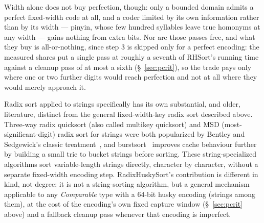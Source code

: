 \documentclass[twoside,leqno,twocolumn]{article}
\begin{document}
Width alone does not buy perfection, though:
only a bounded domain admits a perfect fixed-width code at all,
and a coder limited by its own information rather than by its width --- pinyin, whose few hundred
syllables leave true homonyms at any width --- gains nothing from extra bits.
Nor are those passes free, and what they buy is all-or-nothing, since step 3 is skipped only for a
perfect encoding: the measured shares put a single pass at roughly a seventh of RHSort's running time
against a cleanup pass of at most a sixth (\S~\ref{sec:pcrit}), so the trade pays only where one or
two further digits would reach perfection and not at all where they would merely approach it.

Radix sort applied to strings specifically has its own substantial, and older, literature,
distinct from the general fixed-width-key radix sort described above.
Three-way radix quicksort (also called multikey quicksort) and MSD (most-significant-digit)
radix sort for strings were both popularized by Bentley and Sedgewick's classic treatment~\cite{314161.314321},
and burstsort~\cite{1064546.1180622} improves cache behaviour further by building a small trie to bucket strings before sorting.
These string-specialized algorithms sort variable-length strings directly, character by character, without a separate fixed-width encoding step.
RadixHuskySort's contribution is different in kind, not degree:
it is not a string-sorting algorithm, but a general mechanism applicable to any \textit{Comparable} type
with a 64-bit husky encoding (strings among them),
at the cost of the encoding's own fixed capture window (\S~\ref{sec:pcrit} above)
and a fallback cleanup pass whenever that encoding is imperfect.
\end{document}

